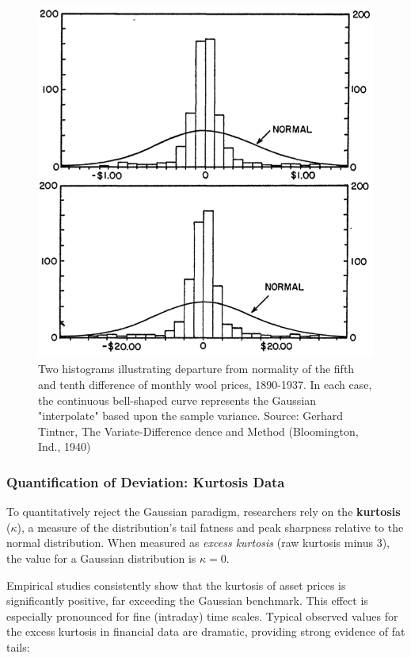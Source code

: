 \documentclass{ieeetj}
\begin{document}
\begin{figure}
    \centering
    \includegraphics[width=1\linewidth]{heavy_tailed.png}
    \caption{Two histograms illustrating departure from normality of the fifth and tenth difference of monthly wool prices, 1890-1937. In each case, the continuous bell-shaped curve represents the Gaussian "interpolate" based upon the sample variance. Source: Gerhard Tintner, The Variate-Difference dence and Method (Bloomington, Ind., 1940)}
    \label{fig:placeholder}
\end{figure}



\subsubsection{Quantification of Deviation: Kurtosis Data}

To quantitatively reject the Gaussian paradigm, researchers rely on the \textbf{kurtosis} ($\kappa$), a measure of the distribution’s tail fatness and peak sharpness relative to the normal distribution. When measured as \textit{excess kurtosis} (raw kurtosis minus 3), the value for a Gaussian distribution is $\kappa=0$.

Empirical studies consistently show that the kurtosis of asset prices is significantly positive, far exceeding the Gaussian benchmark. This effect is especially pronounced for fine (intraday) time scales. Typical observed values for the excess kurtosis in financial data are dramatic, providing strong evidence of fat tails:
\end{document}
